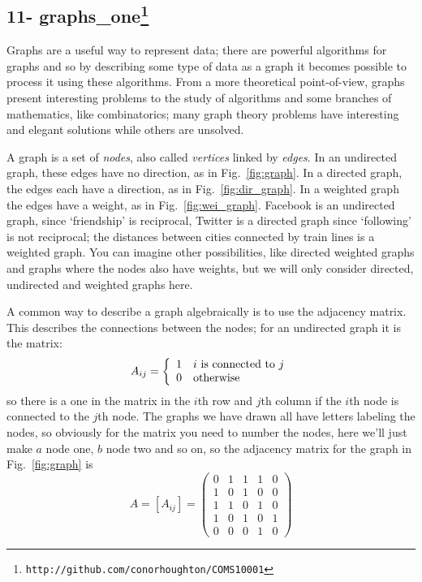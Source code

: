 \documentclass[11pt,a4paper]{scrartcl}
\begin{document}
\subsection*{11- graphs\_one\footnote{\texttt{http://github.com/conorhoughton/COMS10001}}}

Graphs are a useful way to represent data; there are powerful
algorithms for graphs and so by describing some type of data as a
graph it becomes possible to process it using these algorithms. From a
more theoretical point-of-view, graphs present interesting problems to
the study of algorithms and some branches of mathematics, like
combinatorics; many graph theory problems have interesting and elegant
solutions while others are unsolved.

A graph is a set of \textsl{nodes}, also called \textsl{vertices}
linked by \textsl{edges}. In an undirected graph, these edges have no
direction, as in Fig.~\ref{fig:graph}. In a directed graph, the edges
each have a direction, as in Fig.~\ref{fig:dir_graph}. In a weighted
graph the edges have a weight, as in
Fig.~\ref{fig:wei_graph}. Facebook is an undirected graph, since
\lq{}friendship\rq{} is reciprocal, Twitter is a directed graph since
\lq{}following\rq{} is not reciprocal; the distances between cities
connected by train lines is a weighted graph. You can imagine other
possibilities, like directed weighted graphs and graphs where the
nodes also have weights, but we will only consider directed,
undirected and weighted graphs here.

A common way to describe a graph algebraically is to use the adjacency
matrix. This describes the connections between the nodes; for an
undirected graph it is the matrix:
\begin{equation}
A_{ij}=\left\{\begin{array}{cl}1&i\mbox{ is connected to }j\cr0&\mbox{otherwise}
\end{array}\right.
\end{equation}
so there is a one in the matrix in the $i$th row and $j$th column if
the $i$th node is connected to the $j$th node. The graphs we have
drawn all have letters labeling the nodes, so obviously for the matrix
you need to number the nodes, here we'll just make $a$ node one, $b$
node two and so on, so the adjacency matrix for the graph in
Fig.~\ref{fig:graph} is
\begin{equation}
A=[A_{ij}]=\left(
\begin{array}{ccccc}
0&1&1&1&0\\
1&0&1&0&0\\
1&1&0&1&0\\
1&0&1&0&1\\
0&0&0&1&0
\end{array}
\right)
\end{equation}
\end{document}
